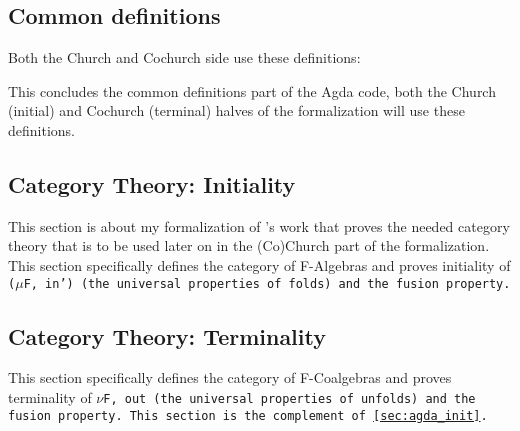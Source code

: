 \subsection{Common definitions}
Both the Church and Cochurch side use these definitions:

This concludes the common definitions part of the Agda code, both the Church (initial) and Cochurch (terminal) halves of the formalization will use these definitions.

\subsection{Category Theory: Initiality}\label{sec:agda_init}
This section is about my formalization of \cite{Harper2011}'s work that proves the needed category theory that is to be used later on in the (Co)Church part of the formalization.
This section specifically defines the category of F-Algebras and proves initiality of \tt($\mu$F, in') (the universal properties of folds) and the fusion property.


\subsection{Category Theory: Terminality}
This section specifically defines the category of F-Coalgebras and proves terminality of \tt{$\nu$F, out} (the universal properties of unfolds) and the fusion property.
This section is the complement of \autoref{sec:agda_init}.

